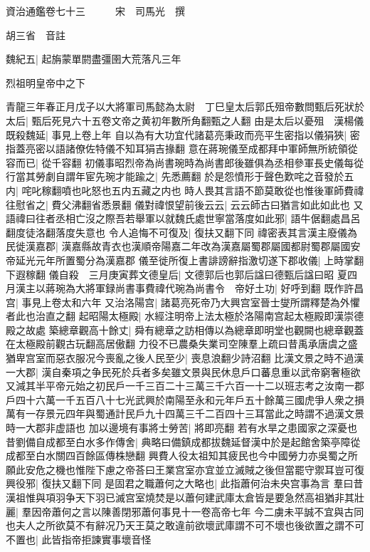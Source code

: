 資治通鑑卷七十三　　　宋　司馬光　撰

胡三省　音註

魏紀五|{
	起旃蒙單閼盡彊圉大荒落凡三年}


烈祖明皇帝中之下

青龍三年春正月戊子以大將軍司馬懿為太尉　丁巳皇太后郭氏殂帝數問甄后死狀於太后|{
	甄后死見六十五卷文帝之黄初年數所角翻甄之人翻}
由是太后以憂殂　漢楊儀既殺魏延|{
	事見上卷上年}
自以為有大功宜代諸葛亮秉政而亮平生密指以儀狷狹|{
	密指蓋亮密以語諸僚佐特儀不知耳狷吉掾翻}
意在蔣琬儀至成都拜中軍師無所統領從容而已|{
	從千容翻}
初儀事昭烈帝為尚書琬時為尚書郎後雖俱為丞相參軍長史儀每從行當其勞劇自謂年宦先琬才能踰之|{
	先悉薦翻}
於是怨憤形于聲色歎咤之音發於五内|{
	咤叱稼翻噴也叱怒也五内五藏之内也}
時人畏其言語不節莫敢從也惟後軍師費禕往慰省之|{
	費父沸翻省悉景翻}
儀對禕恨望前後云云|{
	云云師古曰猶言如此如此也}
又語禕曰往者丞相亡沒之際吾若舉軍以就魏氏處世寧當落度如此邪|{
	語牛倨翻處昌呂翻度徒洛翻落度失意也}
令人追悔不可復及|{
	復扶又翻下同}
禕密表其言漢主廢儀為民徙漢嘉郡|{
	漢嘉縣故青衣也漢順帝陽嘉二年改為漢嘉屬蜀郡屬國都尉蜀郡屬國安帝延光元年所置蜀分為漢嘉郡}
儀至徙所復上書誹謗辭指激切遂下郡收儀|{
	上時掌翻下遐稼翻}
儀自殺　三月庚寅葬文德皇后|{
	文德郭后也郭后諡曰德甄后諡曰昭}
夏四月漢主以蔣琬為大將軍録尚書事費禕代琬為尚書令　帝好土功|{
	好呼到翻}
既作許昌宫|{
	事見上卷太和六年}
又治洛陽宫|{
	諸葛亮死帝乃大興宫室晉士燮所謂釋楚為外懼者此也治直之翻}
起昭陽太極殿|{
	水經注明帝上法太極於洛陽南宫起太極殿即漢崇德殿之故處}
築總章觀高十餘丈|{
	舜有總章之訪相傳以為總章即明堂也觀闕也總章觀蓋在太極殿前觀古玩翻高居傲翻}
力役不已農桑失業司空陳羣上疏曰昔禹承唐虞之盛猶卑宫室而惡衣服况今喪亂之後人民至少|{
	喪息浪翻少詩沼翻}
比漢文景之時不過漢一大郡|{
	漢自秦項之争民死於兵者多矣雖文景與民休息戶口蕃息重以武帝窮奢極欲又減其半平帝元始之初民戶一千三百二十三萬三千六百一十二以班志考之汝南一郡戶四十六萬一千五百八十七光武興於南陽至永和元年戶五十餘萬三國虎爭人衆之損萬有一存景元四年與蜀通計民戶九十四萬三千二百四十三耳當此之時謂不過漢文景時一大郡非虚語也}
加以邊境有事將士勞苦|{
	將即亮翻}
若有水旱之患國家之深憂也昔劉備自成都至白水多作傳舍|{
	典略曰備鎮成都拔魏延督漢中於是起館舍築亭障從成都至白水關四百餘區傳株戀翻}
興費人役太祖知其疲民也今中國勞力亦吳蜀之所願此安危之機也惟陛下慮之帝荅曰王業宫室亦宜並立滅賊之後但當罷守禦耳豈可復興役邪|{
	復扶又翻下同}
是固君之職蕭何之大略也|{
	此指蕭何治未央宫事為言}
羣曰昔漢祖惟與項羽争天下羽已滅宫室燒焚是以蕭何建武庫太倉皆是要急然高祖猶非其壯麗|{
	羣因帝蕭何之言以陳善閉邪蕭何事見十一卷高帝七年}
今二虜未平誠不宜與古同也夫人之所欲莫不有辭况乃天王莫之敢違前欲壞武庫謂不可不壞也後欲置之謂不可不置也|{
	此皆指帝拒諫實事壞音怪}
